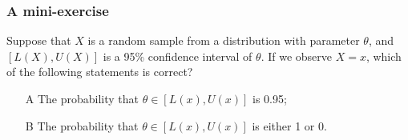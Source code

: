 \documentclass{beamer}
\begin{document}

\begin{frame}
\frametitle{A mini-exercise}
Suppose that $X$ is a random sample from a distribution with parameter $\theta$, and $[L(X),U(X)]$ is a 95\% confidence interval of $\theta$. If we observe $X=x$, which of the following statements is correct?
\begin{itemize}
\item[A] The probability that $\theta \in [L(x),U(x)]$ is 0.95;
\item[B] The probability that $\theta \in [L(x),U(x)]$ is either 1 or 0.
\end{itemize}
\end{frame}

\end{document}
